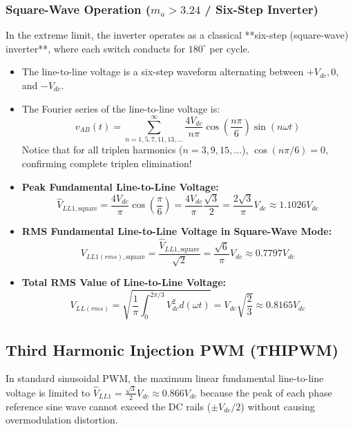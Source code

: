 \documentclass[11pt,a4paper]{article}
\begin{document}
\subsubsection{Square-Wave Operation ($m_a > 3.24$ / Six-Step Inverter)}
In the extreme limit, the inverter operates as a classical **six-step (square-wave) inverter**, where each switch conducts for $180^\circ$ per cycle.
\begin{itemize}[leftmargin=*]
  \item The line-to-line voltage is a six-step waveform alternating between $+V_{dc}, 0,$ and $-V_{dc}$.
  \item The Fourier series of the line-to-line voltage is:
  \begin{equation}
  v_{AB}(t) = \sum_{n=1,5,7,11,13,\dots}^{\infty} \frac{4V_{dc}}{n\pi} \cos\left(\frac{n\pi}{6}\right) \sin(n\omega t)
  \end{equation}
  Notice that for all triplen harmonics ($n = 3, 9, 15, \dots$), $\cos(n\pi/6) = 0$, confirming complete triplen elimination!
  \item \textbf{Peak Fundamental Line-to-Line Voltage:}
  \begin{equation}
  \hat{V}_{LL1,\text{square}} = \frac{4V_{dc}}{\pi} \cos\left(\frac{\pi}{6}\right) = \frac{4V_{dc}}{\pi} \frac{\sqrt{3}}{2} = \frac{2\sqrt{3}}{\pi}V_{dc} \approx 1.1026 V_{dc}
  \end{equation}
  \item \textbf{RMS Fundamental Line-to-Line Voltage in Square-Wave Mode:}
  \begin{equation}
  V_{LL1(rms),\text{square}} = \frac{\hat{V}_{LL1,\text{square}}}{\sqrt{2}} = \frac{\sqrt{6}}{\pi}V_{dc} \approx 0.7797 V_{dc}
  \end{equation}
  \item \textbf{Total RMS Value of Line-to-Line Voltage:}
  \begin{equation}
  V_{LL(rms)} = \sqrt{\frac{1}{\pi} \int_0^{2\pi/3} V_{dc}^2 d(\omega t)} = V_{dc}\sqrt{\frac{2}{3}} \approx 0.8165 V_{dc}
  \end{equation}
\end{itemize}

\subsection{Third Harmonic Injection PWM (THIPWM)}

In standard sinusoidal PWM, the maximum linear fundamental line-to-line voltage is limited to $\hat{V}_{LL1} = \frac{\sqrt{3}}{2}V_{dc} \approx 0.866 V_{dc}$ because the peak of each phase reference sine wave cannot exceed the DC rails ($\pm V_{dc}/2$) without causing overmodulation distortion.
\end{document}
